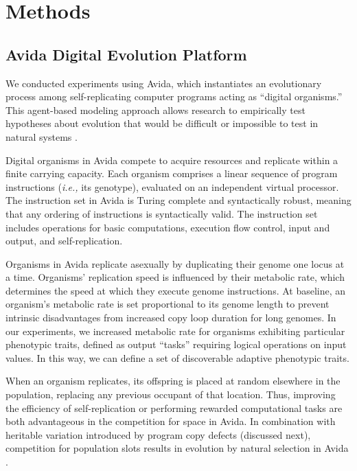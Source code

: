 \section{Methods} \label{sec:methods}

\subsection{Avida Digital Evolution Platform}



We conducted experiments using Avida, which instantiates an evolutionary process among self-replicating computer programs acting as ``digital organisms.''
This agent-based modeling approach allows research to empirically test hypotheses about evolution that would be difficult or impossible to test in natural systems \citep{Ofria:2009avida}.

% 

Digital organisms in Avida compete to acquire resources and replicate within a finite carrying capacity.
Each organism comprises a linear sequence of program instructions (\textit{i.e.,} its genotype), evaluated on an independent virtual processor.
The instruction set in Avida is Turing complete and syntactically robust, meaning that any ordering of instructions is syntactically valid.
The instruction set includes operations for basic computations, execution flow control, input and output, and self-replication.

Organisms in Avida replicate asexually by duplicating their genome one locus at a time.
Organisms' replication speed is influenced by their metabolic rate, which determines the speed at which they execute genome instructions.
At baseline, an organism's metabolic rate is set proportional to its genome length to prevent intrinsic disadvantages from increased copy loop duration for long genomes.
In our experiments, we increased metabolic rate for organisms exhibiting particular phenotypic traits, defined as output ``tasks'' requiring logical operations on input values.
In this way, we can define a set of discoverable adaptive phenotypic traits.

When an organism replicates, its offspring is placed at random elsewhere in the population, replacing any previous occupant of that location.
Thus, improving the efficiency of self-replication or performing rewarded computational tasks are both advantageous in the competition for space in Avida.
In combination with heritable variation introduced by program copy defects (discussed next), competition for population slots results in evolution by natural selection in Avida \citep{pennock2007models}.

